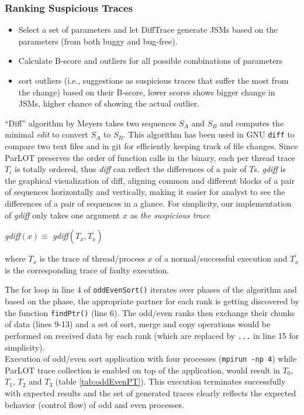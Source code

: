 \subsubsection{Ranking Suspicious Traces}
\begin{itemize}
	\item Select a set of parameters and let DiffTrace generate JSMs based on the parameters (from both buggy and bug-free).
	\item Calculate B-score and outliers for all possible combinations of parameters
	\item sort outliers (i.e., suggestions as suspicious traces that suffer the most from the change) based on their B-score, lower scores shows bigger change in JSMs, higher chance of showing the actual outlier.
\end{itemize}

``Diff'' algorithm by Meyers \cite{diff-myers} takes two sequences $S_A$ and $S_B$ and computes the minimal \textit{edit} to convert $S_A$ to $S_B$. This algorithm has been used in GNU \texttt{diff} to compare two text files and in git for efficiently keeping track of file changes.
Since ParLOT preserves the order of function calls in the binary, each per thread trace $T_i$ is totally ordered, thus \textit{diff} can reflect the differences of a pair of $T$s. \textit{gdiff} is the graphical visualization of diff, aligning common and different blocks of a pair of sequences horizontally and vertically, making it easier for analyst to see the differences of a pair of sequences in a glance.  
For simplicity, our implementation of \textit{gdiff} only takes one argument $x$ as \textit{the suspicious trace}

\textit{gdiff}$(x) \equiv $ \textit{gdiff}$(T_x,T_x^\prime)$

where $T_x$ is the trace of thread/process $x$ of a normal/successful execution and $T^\prime_x$ is the corresponding trace of faulty execution.



The for loop in line 4 of \texttt{oddEvenSort()} iterates over phases of the algorithm and based on the phase, the appropriate partner for each rank is getting discovered by the function \texttt{findPtr()} (line 6). The odd/even ranks then exchange their chunks of data (lines 9-13) and a set of sort, merge and copy operations would be performed on received data by each rank (which are replaced by \texttt{...} in line 15 for simplicity).
\\

Execution of odd/even sort application with four processes (\texttt{mpirun -np 4}) while ParLOT trace collection is enabled on top of the application, would result in $T_0$, $T_1$, $T_2$ and $T_3$ (table \ref{tab:oddEvenPT}). This execution terminates successfully with expected results and the set of generated traces clearly reflects the expected behavior (control flow) of odd and even processes.
%


